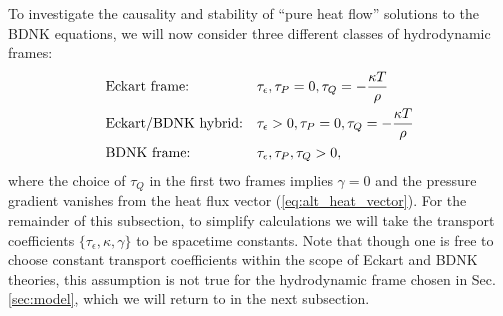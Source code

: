 \documentclass[%
notitlepage,
superscriptaddress,
nofootinbib,
amsmath,
amssymb,
aps,
twocolumn
]{revtex4-1}
\begin{document}
To investigate the causality and stability of ``pure heat flow'' solutions to the BDNK equations, we will now consider three different classes of hydrodynamic frames:
\begin{equation} \label{eq:heat_frames}
\begin{aligned}
&\textnormal{Eckart frame:}  &&\tau_{\epsilon}, \tau_{P} = 0, \tau_{Q} = -\frac{\kappa T}{\rho} \\
&\textnormal{Eckart/BDNK hybrid:} &&\tau_{\epsilon} > 0, \tau_{P} = 0, \tau_{Q} = -\frac{\kappa T}{\rho} \\
&\textnormal{BDNK frame:} &&\tau_{\epsilon}, \tau_{P}, \tau_{Q} > 0,
\end{aligned}
\end{equation}
where the choice of $\tau_{Q}$ in the first two frames implies $\gamma = 0$ and the pressure gradient vanishes from the heat flux vector (\ref{eq:alt_heat_vector}).  For the remainder of this subsection, to simplify calculations we will take the transport coefficients $\{\tau_{\epsilon}, \kappa, \gamma\}$ to be spacetime constants.  Note that though one is free to choose constant transport coefficients within the scope of Eckart and BDNK theories, this assumption is not true for the hydrodynamic frame chosen in Sec. \ref{sec:model}, which we will return to in the next subsection.
\end{document}
